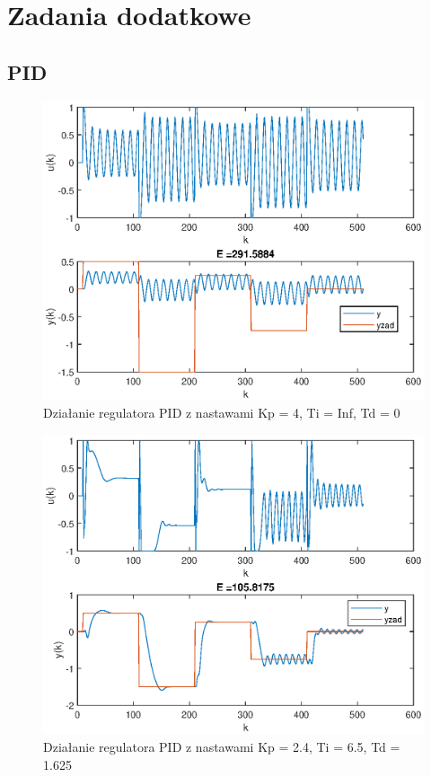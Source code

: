 \chapter{Zadania dodatkowe}
	\label{ch:dod}
	
	\section{PID}
		\label{sec:PID}
		
		\begin{figure}[h!]
			\centering
			\includegraphics[width=\linewidth]{img/strojeniePID_Kp_4_Ti_duzo_Td_0.eps}
			\caption{Działanie regulatora PID z nastawami Kp = 4, Ti = Inf, Td = 0}
			\label{fig:PID0}
		\end{figure}
		
		\begin{figure}[h!]
			\centering
			\includegraphics[width=\linewidth]{img/strojeniePID_Ziegler_Nichols.eps}
			\caption{Działanie regulatora PID z nastawami Kp = 2.4, Ti = 6.5, Td = 1.625}
			\label{fig:PID1}
		\end{figure}
		
